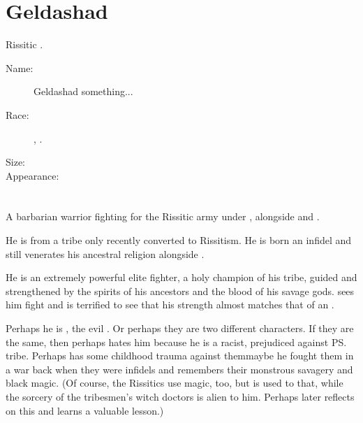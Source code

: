 \section{Geldashad}
Rissitic \Ashenoch{}. 

\begin{description}
  \item[Name:] Geldashad something... 
  \item[Race:] \Scatha{}, \Ashenoch{}. 
  \item[Size:] 
  \item[Appearance:] 
\end{description}















\section{\KarsaOrlong}
A barbarian warrior fighting for the Rissitic army under \Narkiza, alongside \Shilred{} and \Dzasselid. 

He is from a \Durcaci{} tribe only recently converted to Rissitism. He is born an infidel and still venerates his ancestral religion alongside \Nechsain. 

He is an extremely powerful elite fighter, a holy champion of his tribe, guided and strengthened by the spirits of his ancestors and the blood of his savage gods. \Shilred{} sees him fight and is terrified to see that his strength almost matches that of an \Ashenoch. 

Perhaps he is \Geldashad, the evil \Ashenoch. Or perhaps they are two different characters. If they are the same, then perhaps \Narkiza{} hates him because he is a racist, prejudiced against \ps{\KarsaOrlong} tribe. Perhaps \Narkiza{} has some childhood trauma against them\dash maybe he fought them in a war back when they were infidels and remembers their monstrous savagery and black magic. (Of course, the Rissitics use  magic, too, but \Narkiza{} is used to that, while the sorcery of the tribesmen's witch doctors is alien to him. Perhaps \Narkiza{} later reflects on this and learns a valuable lesson.)
















